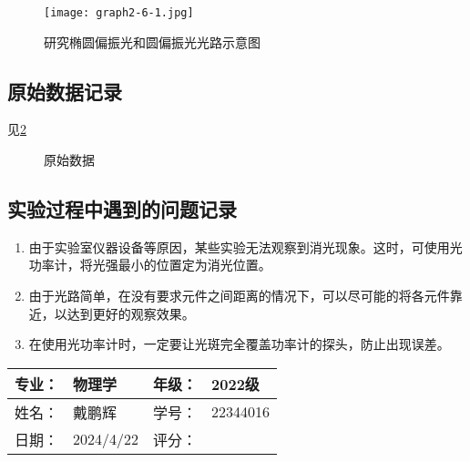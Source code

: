 \documentclass[dvipsnames, svgnames,a4paper,11pt]{article}
\begin{document}
	\begin{figure}[htbp]
		\centering
		\texttt{[image: graph2-6-1.jpg]}
		\caption{研究椭圆偏振光和圆偏振光光路示意图}
		\label{fig:graph2-8-1}
	\end{figure}





\subsection{原始数据记录}

	见\cref{fig:data}

	\begin{figure}[htbp]
		\centering
		\quad
		\quad
		\quad
		\quad

		\caption{原始数据}
		\label{fig:data}
	\end{figure}



\subsection{实验过程中遇到的问题记录}

\begin{enumerate}
	\item 由于实验室仪器设备等原因，某些实验无法观察到消光现象。这时，可使用光功率计，将光强最小的位置定为消光位置。
	\item 由于光路简单，在没有要求元件之间距离的情况下，可以尽可能的将各元件靠近，以达到更好的观察效果。
	\item 在使用光功率计时，一定要让光斑完全覆盖功率计的探头，防止出现误差。
	
\end{enumerate}
	

\clearpage
\begin{table}
	\renewcommand\arraystretch{1.7}
	\begin{tabularx}{\textwidth}{|X|X|X|X|}
	\hline
	专业：& 物理学 &年级：& 2022级\\
	\hline
	姓名： & 戴鹏辉 & 学号：& 22344016\\
	\hline
    日期：& 2024/4/22 & 评分： &\\
	\hline
	\end{tabularx}
\end{table}
\end{document}
